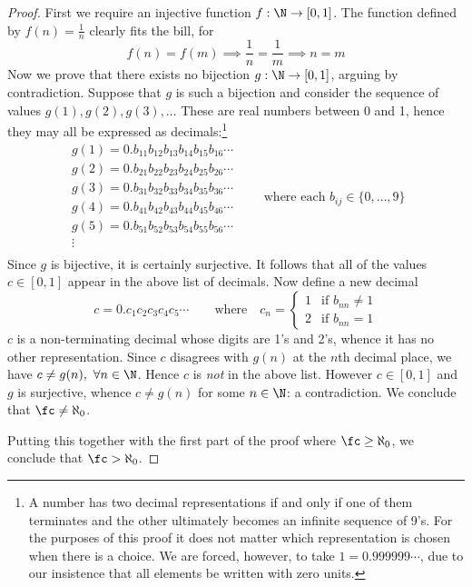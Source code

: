 \begin{proof}
	First we require an injective function $f:\N\to[0,1]$. The function defined by $f(n)=\frac 1n$ clearly fits the bill, for
	\[
		f(n)=f(m)\implies \frac 1n=\frac 1m\implies n=m
	\]
	Now we prove that there exists no bijection $g:\N\to[0,1]$, arguing by contradiction. Suppose that $g$ is such a bijection and consider the sequence of values $g(1),g(2),g(3),\ldots$ These are real numbers between 0 and 1, hence they may all be expressed as decimals:\footnote{A number has two decimal representations if and only if one of them terminates and the other ultimately becomes an infinite sequence of 9's. For the purposes of this proof it does not matter which representation is chosen when there is a choice. We are forced, however, to take $1=0.999999\cdots$, due to our insistence that all elements be written with zero units.}
	\[
		\begin{array}{c}
			g(1)=0.b_{11}b_{12}b_{13}b_{14}b_{15}b_{16}\cdots\\[2pt]
			g(2)=0.b_{21}b_{22}b_{23}b_{24}b_{25}b_{26}\cdots\\[2pt]
			g(3)=0.b_{31}b_{32}b_{33}b_{34}b_{35}b_{36}\cdots\\[2pt]
			g(4)=0.b_{41}b_{42}b_{43}b_{44}b_{45}b_{46}\cdots\\[2pt]
			g(5)=0.b_{51}b_{52}b_{53}b_{54}b_{55}b_{56}\cdots\\[-2pt]
			\vdots\\[-8pt]
		\end{array}
		\qquad
		\text{where each }b_{ij}\in\{0,\ldots,9\}
	\]
	Since $g$ is bijective, it is certainly surjective. It follows that all of the values $c\in[0,1]$ appear in the above list of decimals. Now define a new decimal
	\[
		c=0.c_1c_2c_3c_4c_5\cdots\qquad\text{where}\quad c_n=
		\begin{cases}
			1&\text{if }b_{nn}\neq 1\\
			2&\text{if }b_{nn}=1
		\end{cases}
	\]
	$c$ is a non-terminating decimal whose digits are 1's and 2's, whence it has no other representation. Since $c$ disagrees with $g(n)$ at the $n$th decimal place, we have $c\neq g(n),\ \forall n\in\N$. Hence $c$ is \emph{not} in the above list. However $c\in[0,1]$ and $g$ is surjective, whence $c\neq g(n)$ for some $n\in\N$: a contradiction. We conclude that $\fc\neq\aleph_0$.\par
	Putting this together with the first part of the proof where $\fc\ge\aleph_0$, we conclude that $\fc>\aleph_0$.
\end{proof}

